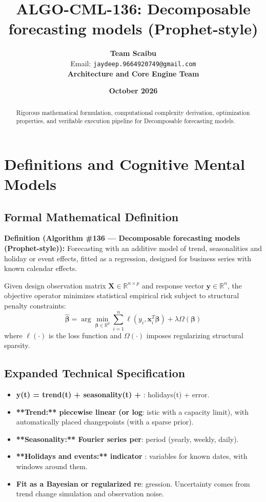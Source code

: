 \documentclass[11pt,a4paper]{article}
\title{\textbf{ALGO-CML-136: Decomposable forecasting models (Prophet-style)}}
\author{\textbf{Team Scaibu} \\ \small Email: \texttt{jaydeep.9664920749@gmail.com} \\ \small \textbf{Architecture and Core Engine Team}}
\date{\textbf{October 2026}}
\theoremstyle{definition}
\begin{document}
\maketitle

\begin{abstract}
Rigorous mathematical formulation, computational complexity derivation, optimization properties, and verifiable execution pipeline for Decomposable forecasting models.
\end{abstract}

\section{Definitions and Cognitive Mental Models}

\subsection{Formal Mathematical Definition}
\textbf{Definition (Algorithm \#136 --- Decomposable forecasting models (Prophet-style)):}
Forecasting with an additive model of trend, seasonalities and holiday or event effects, fitted as a regression, designed for business series with known calendar effects.

Given design observation matrix $\mathbf{X} \in \mathbb{R}^{n \times p}$ and response vector $\mathbf{y} \in \mathbb{R}^n$, the objective operator minimizes statistical empirical risk subject to structural penalty constraints:
\begin{equation}
\hat{\boldsymbol{\beta}} = \arg\min_{\boldsymbol{\beta} \in \mathbb{R}^p} \sum_{i=1}^n \ell(y_i, \mathbf{x}_i^T \boldsymbol{\beta}) + \lambda \Omega(\boldsymbol{\beta})
\end{equation}
where $\ell(\cdot)$ is the loss function and $\Omega(\cdot)$ imposes regularizing structural sparsity.

\subsection{Expanded Technical Specification}
\begin{itemize}
\item \textbf{y(t) = trend(t) + seasonality(t) + }: holidays(t) + error.
\item \textbf{**Trend:** piecewise linear (or log}: istic with a capacity limit), with automatically placed changepoints (with a sparse prior).
\item \textbf{**Seasonality:** Fourier series per}:  period (yearly, weekly, daily).
\item \textbf{**Holidays and events:** indicator }: variables for known dates, with windows around them.
\item \textbf{Fit as a Bayesian or regularized re}: gression. Uncertainty comes from trend change simulation and observation noise.
\end{itemize}
\end{document}
